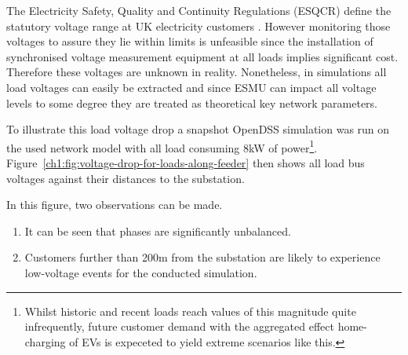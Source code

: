 The Electricity Safety, Quality and Continuity Regulations (ESQCR) define the statutory voltage range at UK electricity customers \cite{HealthandSafetyExecutive2002}.
However monitoring those voltages to assure they lie within limits is unfeasible since the installation of synchronised voltage measurement equipment at all loads implies significant cost.
Therefore these voltages are unknown in reality.
Nonetheless, in simulations all load voltages can easily be extracted and since ESMU can impact all voltage levels to some degree they are treated as theoretical key network parameters.

To illustrate this load voltage drop a snapshot OpenDSS simulation was run on the used network model with all load consuming  8kW of power\footnote{Whilst historic and recent loads reach values of this magnitude quite infrequently, future customer demand with the aggregated effect home-charging of EVs is expeceted to yield extreme scenarios like this.}.
Figure~\ref{ch1:fig:voltage-drop-for-loads-along-feeder} then shows all load bus voltages against their distances to the substation.




In this figure, two observations can be made.

\begin{enumerate}
	\item It can be seen that phases are significantly unbalanced. 
	\item Customers further than 200m from the substation are likely to experience low-voltage events for the conducted simulation.
\end{enumerate}

